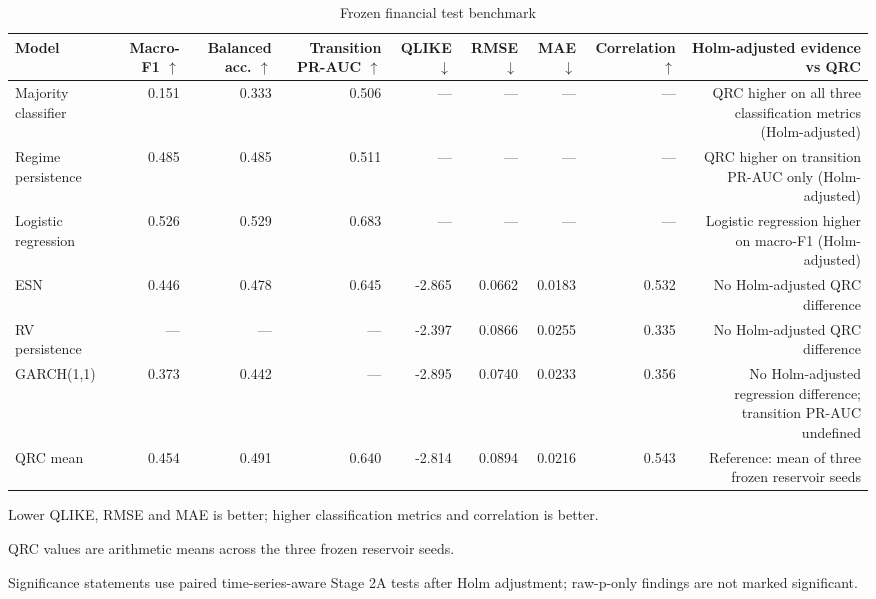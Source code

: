 \begin{table}[t]
\centering
\small
\caption{Frozen financial test benchmark}
\begin{tabular}{lrrrrrrrr}
\toprule
Model & Macro-F1 $\uparrow$ & Balanced acc. $\uparrow$ & Transition PR-AUC $\uparrow$ & QLIKE $\downarrow$ & RMSE $\downarrow$ & MAE $\downarrow$ & Correlation $\uparrow$ & Holm-adjusted evidence vs QRC \\
\midrule
Majority classifier & 0.151 & 0.333 & 0.506 & --- & --- & --- & --- & QRC higher on all three classification metrics (Holm-adjusted) \\
Regime persistence & 0.485 & 0.485 & 0.511 & --- & --- & --- & --- & QRC higher on transition PR-AUC only (Holm-adjusted) \\
Logistic regression & 0.526 & 0.529 & 0.683 & --- & --- & --- & --- & Logistic regression higher on macro-F1 (Holm-adjusted) \\
ESN & 0.446 & 0.478 & 0.645 & -2.865 & 0.0662 & 0.0183 & 0.532 & No Holm-adjusted QRC difference \\
RV persistence & --- & --- & --- & -2.397 & 0.0866 & 0.0255 & 0.335 & No Holm-adjusted QRC difference \\
GARCH(1,1) & 0.373 & 0.442 & --- & -2.895 & 0.0740 & 0.0233 & 0.356 & No Holm-adjusted regression difference; transition PR-AUC undefined \\
QRC mean & 0.454 & 0.491 & 0.640 & -2.814 & 0.0894 & 0.0216 & 0.543 & Reference: mean of three frozen reservoir seeds \\
\bottomrule
\end{tabular}
\parbox{0.98\linewidth}{\footnotesize Lower QLIKE, RMSE and MAE is better; higher classification metrics and correlation is better.}
\parbox{0.98\linewidth}{\footnotesize QRC values are arithmetic means across the three frozen reservoir seeds.}
\parbox{0.98\linewidth}{\footnotesize Significance statements use paired time-series-aware Stage 2A tests after Holm adjustment; raw-p-only findings are not marked significant.}
\end{table}
